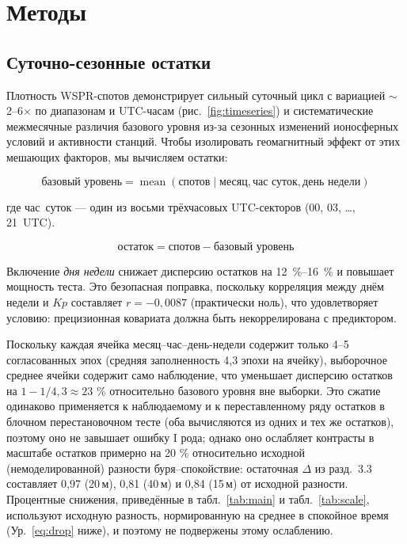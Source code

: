 \documentclass{agujournal2019}
\begin{document}
\section{Методы}

\subsection{Суточно-сезонные остатки}

Плотность WSPR-спотов демонстрирует сильный суточный цикл с вариацией
$\sim$2--6$\times$ по диапазонам и UTC-часам
(рис.~\ref{fig:timeseries}) и систематические межмесячные различия
базового уровня из-за сезонных изменений ионосферных условий и активности
станций. Чтобы изолировать геомагнитный эффект от этих мешающих факторов,
мы вычисляем остатки:

\begin{equation}
	\mbox{базовый уровень} = \operatorname{mean}(\mbox{спотов} \mid \mbox{месяц},
	\mbox{час суток}, \mbox{день недели})
	\label{eq:baseline}
\end{equation}

где \mbox{час суток} --- один из восьми трёхчасовых UTC-секторов
(00, 03, \ldots, 21~UTC).

\begin{equation}
	\mbox{остаток} = \mbox{спотов} - \mbox{базовый уровень}
	\label{eq:residual}
\end{equation}

Включение \emph{дня недели} снижает дисперсию остатков на
\SIrange{12}{16}{\percent} и повышает мощность теста. Это безопасная
поправка, поскольку корреляция между днём недели и $Kp$ составляет
$r = -0{,}0087$ (практически ноль), что удовлетворяет условию: прецизионная
ковариата должна быть некоррелирована с предиктором.

Поскольку каждая ячейка месяц--час--день-недели содержит только 4--5
согласованных эпох (средняя заполненность 4,3 эпохи на ячейку), выборочное
среднее ячейки содержит само наблюдение, что уменьшает дисперсию остатков
на $1 - 1/4{,}3 \approx 23$ \% относительно базового уровня вне выборки. Это
сжатие одинаково применяется к наблюдаемому и к переставленному ряду
остатков в блочном перестановочном тесте (оба вычисляются из одних и тех же
остатков), поэтому оно не завышает ошибку I рода; однако оно ослабляет
контрасты в масштабе остатков примерно на 20 \% относительно исходной
(немоделированной) разности буря--спокойствие: остаточная $\Delta$ из
разд.~3.3 составляет 0,97 (20\,м), 0,81 (40\,м) и 0,84 (15\,м) от исходной
разности. Процентные снижения, приведённые в табл.~\ref{tab:main} и
табл.~\ref{tab:scale}, используют исходную разность, нормированную на
среднее в спокойное время (Ур.~\eqref{eq:drop} ниже), и поэтому
не подвержены этому ослаблению.
\end{document}
